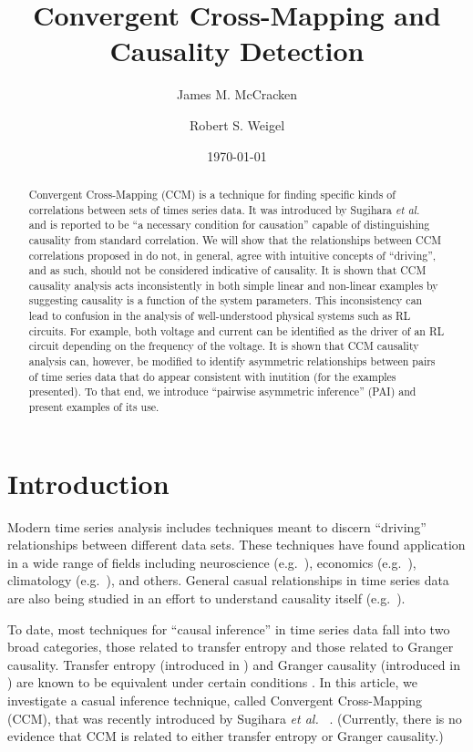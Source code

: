 \documentclass[twocolumn,aps,pre,groupedaddress]{revtex4-1}
\begin{document}
\title{Convergent Cross-Mapping and Causality Detection}
\author{James M. McCracken}
\affiliation{}
\author{Robert S. Weigel}
\email{}
\affiliation{}
\date{\today}

\begin{abstract}
Convergent Cross-Mapping (CCM) is a technique for finding specific kinds of correlations between sets of times series data.  It was introduced by Sugihara {\em et al.\ } \cite{Sugihara2012} and is reported to be ``a necessary condition for causation'' capable of distinguishing causality from standard correlation.  We will show that the relationships between CCM correlations proposed in \cite{Sugihara2012} do not, in general, agree with intuitive concepts of ``driving'', and as such, should not be considered indicative of causality.  It is shown that CCM causality analysis acts inconsistently in both simple linear and non-linear examples by suggesting causality is a function of the system parameters.  This inconsistency can lead to confusion in the analysis of well-understood physical systems such as RL circuits.  For example, both voltage and current can be identified as the driver of an RL circuit depending on the frequency of the voltage.  It is shown that CCM causality analysis can, however, be modified to identify asymmetric relationships between pairs of time series data that do appear consistent with inutition (for the examples presented).  To that end, we introduce ``pairwise asymmetric inference'' (PAI) and present examples of its use.  
\end{abstract}

\pacs{}
\maketitle

\section{Introduction}
Modern time series analysis includes techniques meant to discern ``driving'' relationships between different data sets.  These techniques have found application in a wide range of fields including neuroscience (e.g.\ \cite{Kaminski2001}), economics (e.g.\ \cite{dufour1998,dufour2006}), climatology (e.g.\ \cite{mosedale2006}), and others.  General casual relationships in time series data are also being studied in an effort to understand causality itself (e.g.\ \cite{eichler2012}).  

To date, most techniques for ``causal inference'' in time series data fall into two broad categories, those related to transfer entropy and those related to Granger causality.  Transfer entropy (introduced in \cite{Schreiber2000}) and Granger causality (introduced in \cite{granger1969}) are known to be equivalent under certain conditions \cite{Barnett2009}.  In this article, we investigate a casual inference technique, called Convergent Cross-Mapping (CCM), that was recently introduced by Sugihara {\em et al.\ } \cite{Sugihara2012}.  (Currently, there is no evidence that CCM is related to either transfer entropy or Granger causality.)
\end{document}
